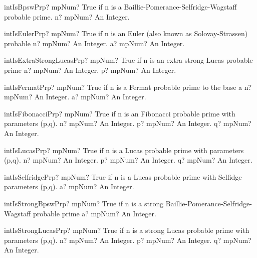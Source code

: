 \documentclass[12pt,a4paper,openany]{book}
\begin{document}
\begin{mpFunctionsExtract}
\mpFunctionOne
{intIsBpswPrp? mpNum? True if n is a Baillie-Pomerance-Selfridge-Wagstaff probable prime.}
{n? mpNum? An Integer.}
\end{mpFunctionsExtract}

\begin{mpFunctionsExtract}
\mpFunctionTwo
{intIsEulerPrp? mpNum? True if n is an Euler (also known as Solovay-Strassen) probable}
{n? mpNum? An Integer.}
{a? mpNum? An Integer.}
\end{mpFunctionsExtract}

\begin{mpFunctionsExtract}
\mpFunctionTwo
{intIsExtraStrongLucasPrp? mpNum? True if n is an extra strong Lucas probable prime}
{n? mpNum? An Integer.}
{p? mpNum? An Integer.}
\end{mpFunctionsExtract}

\begin{mpFunctionsExtract}
\mpFunctionTwo
{intIsFermatPrp? mpNum? True if n is a Fermat probable prime to the base a}
{n? mpNum? An Integer.}
{a? mpNum? An Integer.}
\end{mpFunctionsExtract}

\begin{mpFunctionsExtract}
\mpFunctionThree
{intIsFibonacciPrp? mpNum? True if n is an Fibonacci probable prime with parameters (p,q).}
{n? mpNum? An Integer.}
{p? mpNum? An Integer.}
{q? mpNum? An Integer.}
\end{mpFunctionsExtract}

\begin{mpFunctionsExtract}
\mpFunctionThree
{intIsLucasPrp? mpNum? True if n is a Lucas probable prime with parameters (p,q).}
{n? mpNum? An Integer.}
{p? mpNum? An Integer.}
{q? mpNum? An Integer.}
\end{mpFunctionsExtract}

\begin{mpFunctionsExtract}
\mpFunctionOne
{intIsSelfridgePrp? mpNum? True if n is a Lucas probable prime with Selfidge parameters (p,q).}
{a? mpNum? An Integer.}
\end{mpFunctionsExtract}

\begin{mpFunctionsExtract}
\mpFunctionOne
{intIsStrongBpswPrp? mpNum? True if n is a strong Baillie-Pomerance-Selfridge-Wagstaff probable prime}
{a? mpNum? An Integer.}
\end{mpFunctionsExtract}

\begin{mpFunctionsExtract}
\mpFunctionThree
{intIsStrongLucasPrp? mpNum? True if n is a strong Lucas probable prime with parameters (p,q).}
{n? mpNum? An Integer.}
{p? mpNum? An Integer.}
{q? mpNum? An Integer.}
\end{mpFunctionsExtract}
\end{document}
